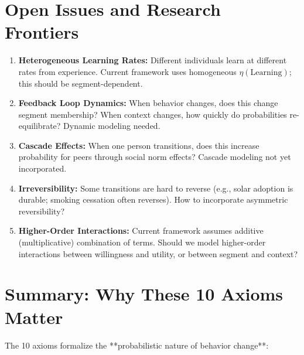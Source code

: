 \documentclass[11pt, a4paper]{article}
\begin{document}

\section{Open Issues and Research Frontiers}

\begin{enumerate}

\item \textbf{Heterogeneous Learning Rates:} Different individuals learn at different rates from experience. Current framework uses homogeneous $\eta(\text{Learning})$; this should be segment-dependent.

\item \textbf{Feedback Loop Dynamics:} When behavior changes, does this change segment membership? When context changes, how quickly do probabilities re-equilibrate? Dynamic modeling needed.

\item \textbf{Cascade Effects:} When one person transitions, does this increase probability for peers through social norm effects? Cascade modeling not yet incorporated.

\item \textbf{Irreversibility:} Some transitions are hard to reverse (e.g., solar adoption is durable; smoking cessation often reverses). How to incorporate asymmetric reversibility?

\item \textbf{Higher-Order Interactions:} Current framework assumes additive (multiplicative) combination of terms. Should we model higher-order interactions between willingness and utility, or between segment and context?

\end{enumerate}


\section{Summary: Why These 10 Axioms Matter}

The 10 axioms formalize the **probabilistic nature of behavior change**:
\end{document}
